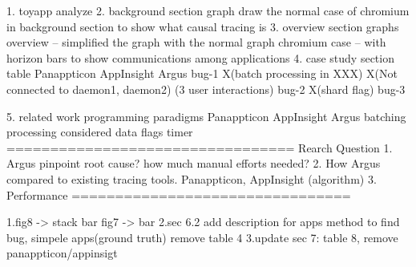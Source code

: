 1. toyapp analyze
2. background section graph
    draw the normal case of chromium in background section to show what causal tracing is
3. overview section graphs
    overview -- simplified the graph with the normal graph
    chromium case -- with horizon bars to show communications among applications
4. case study section table
            Panappticon                         AppInsight                                  Argus
    bug-1   X(batch processing in XXX)         X(Not connected to daemon1, daemon2)         (3 user interactions)
    bug-2   X(shard flag)
    bug-3 

5. related work
    programming paradigms   Panappticon          AppInsight                 Argus 
    batching processing                                                  considered
    data flags
    timer
=================================
Rearch Question
	1. Argus pinpoint root cause? how much manual efforts needed?
	2. How Argus compared to existing tracing tools. Panappticon, AppInsight (algorithm) 
	3. Performance
================================

1.fig8 -> stack bar
  fig7 -> bar
2.sec 6.2
add description for apps 
method to find bug, simpele apps(ground truth)
remove table 4
3.update sec 7:
table 8, remove panappticon/appinsigt

